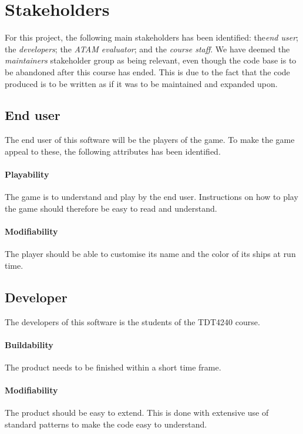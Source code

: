 \chapter{Stakeholders}
\label{cha:stakeholders}
For this project, the following main stakeholders has been identified: the\emph{end user}; the \emph{developers}; the \emph{ATAM evaluator}; and the \emph{course staff}. We have deemed the \emph{maintainers} stakeholder group as being relevant, even though the code base is to be abandoned after this course has ended. This is due to the fact that the code produced is to be written as if it was to be maintained and expanded upon.


    
    \section{End user}
    The end user of this software will be the players of the game. To make the game appeal to these, the following attributes has been identified.

        \subsubsection*{Playability}
        The game is to understand and play by the end user. Instructions on how to play the game should therefore be easy to read and understand.

        \subsubsection*{Modifiability}
        The player should be able to customise its name and the color of its ships at run time.
    
    
    \section{Developer}
    The developers of this software is the students of the TDT4240 course.

        \subsubsection*{Buildability}
        The product needs to be finished within a short time frame.
        
        \subsubsection*{Modifiability}
        The product should be easy to extend. This is done with extensive use of standard patterns to make the code easy to understand.

